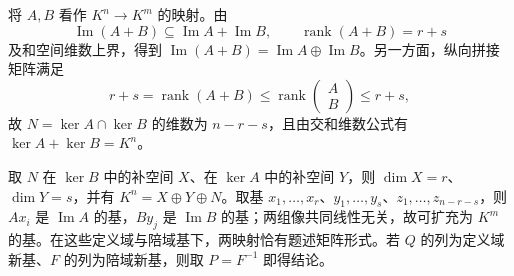 \begin{solve}
将 $A,B$ 看作 $K^n\to K^m$ 的映射。由
\[
    \operatorname{Im}(A+B)\subseteq\operatorname{Im}A+\operatorname{Im}B,
    \qquad \operatorname{rank}(A+B)=r+s
\]
及和空间维数上界，得到 $\operatorname{Im}(A+B)=\operatorname{Im}A\oplus\operatorname{Im}B$。另一方面，纵向拼接矩阵满足
\[
    r+s=\operatorname{rank}(A+B)
    \leq\operatorname{rank}\begin{pmatrix}A\\B\end{pmatrix}
    \leq r+s,
\]
故 $N=\ker A\cap\ker B$ 的维数为 $n-r-s$，且由交和维数公式有 $\ker A+\ker B=K^n$。

取 $N$ 在 $\ker B$ 中的补空间 $X$、在 $\ker A$ 中的补空间 $Y$，则 $\dim X=r$、$\dim Y=s$，并有 $K^n=X\oplus Y\oplus N$。取基 $x_1,\ldots,x_r$、$y_1,\ldots,y_s$、$z_1,\ldots,z_{n-r-s}$，则 $Ax_i$ 是 $\operatorname{Im}A$ 的基，$By_j$ 是 $\operatorname{Im}B$ 的基；两组像共同线性无关，故可扩充为 $K^m$ 的基。在这些定义域与陪域基下，两映射恰有题述矩阵形式。若 $Q$ 的列为定义域新基、$F$ 的列为陪域新基，则取 $P=F^{-1}$ 即得结论。
\end{solve}






